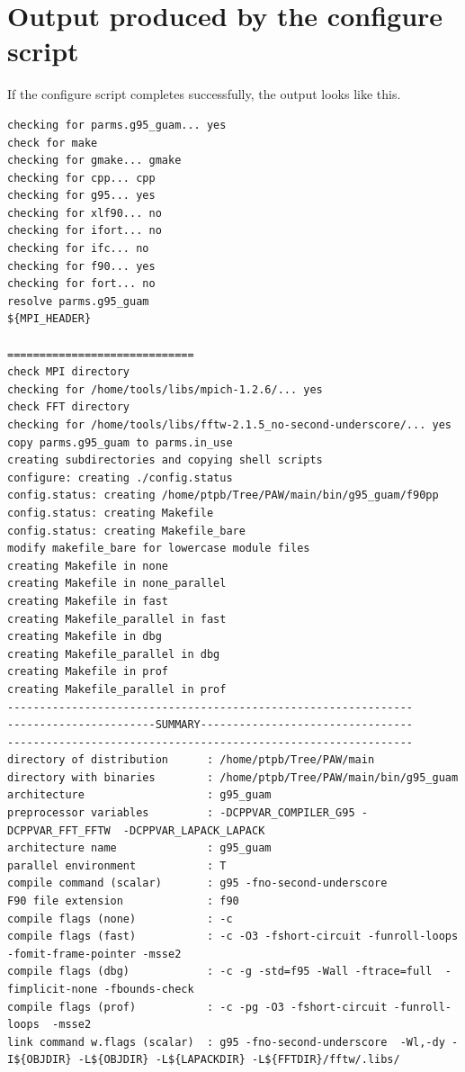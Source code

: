 \documentclass[a4paper,10pt]{report}
\begin{document}
\chapter{Output produced by the configure script}
\label{sec:printoutconfigure}
If the configure script completes successfully, the output looks like this.
\begin{verbatim}
checking for parms.g95_guam... yes
check for make
checking for gmake... gmake
checking for cpp... cpp
checking for g95... yes
checking for xlf90... no
checking for ifort... no
checking for ifc... no
checking for f90... yes
checking for fort... no
resolve parms.g95_guam
${MPI_HEADER}

=============================
check MPI directory
checking for /home/tools/libs/mpich-1.2.6/... yes
check FFT directory
checking for /home/tools/libs/fftw-2.1.5_no-second-underscore/... yes
copy parms.g95_guam to parms.in_use
creating subdirectories and copying shell scripts
configure: creating ./config.status
config.status: creating /home/ptpb/Tree/PAW/main/bin/g95_guam/f90pp
config.status: creating Makefile
config.status: creating Makefile_bare
modify makefile_bare for lowercase module files
creating Makefile in none
creating Makefile in none_parallel
creating Makefile in fast
creating Makefile_parallel in fast
creating Makefile in dbg
creating Makefile_parallel in dbg
creating Makefile in prof
creating Makefile_parallel in prof
---------------------------------------------------------------
-----------------------SUMMARY---------------------------------
---------------------------------------------------------------
directory of distribution      : /home/ptpb/Tree/PAW/main
directory with binaries        : /home/ptpb/Tree/PAW/main/bin/g95_guam
architecture                   : g95_guam
preprocessor variables         : -DCPPVAR_COMPILER_G95 -DCPPVAR_FFT_FFTW  -DCPPVAR_LAPACK_LAPACK
architecture name              : g95_guam
parallel environment           : T
compile command (scalar)       : g95 -fno-second-underscore
F90 file extension             : f90
compile flags (none)           : -c
compile flags (fast)           : -c -O3 -fshort-circuit -funroll-loops -fomit-frame-pointer -msse2
compile flags (dbg)            : -c -g -std=f95 -Wall -ftrace=full  -fimplicit-none -fbounds-check
compile flags (prof)           : -c -pg -O3 -fshort-circuit -funroll-loops  -msse2
link command w.flags (scalar)  : g95 -fno-second-underscore  -Wl,-dy -I${OBJDIR} -L${OBJDIR} -L${LAPACKDIR} -L${FFTDIR}/fftw/.libs/

\end{verbatim}
\end{document}
